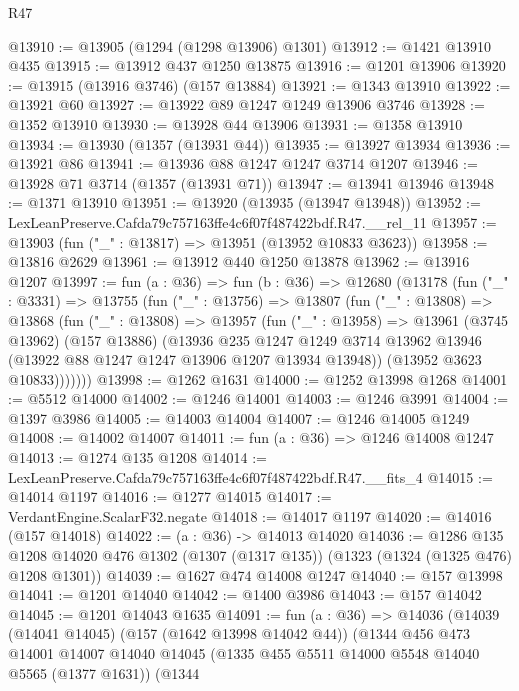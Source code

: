 \begin{lexlean}{R47}
\begin{coremodule}
@13910 := @13905 (@1294 (@1298 @13906) @1301)
@13912 := @1421 @13910 @435
@13915 := @13912 @437 @1250 @13875
@13916 := @1201 @13906
@13920 := @13915 (@13916 @3746) (@157 @13884)
@13921 := @1343 @13910
@13922 := @13921 @60
@13927 := @13922 @89 @1247 @1249 @13906 @3746
@13928 := @1352 @13910
@13930 := @13928 @44 @13906
@13931 := @1358 @13910
@13934 := @13930 (@1357 (@13931 @44))
@13935 := @13927 @13934
@13936 := @13921 @86
@13941 := @13936 @88 @1247 @1247 @3714 @1207
@13946 := @13928 @71 @3714 (@1357 (@13931 @71))
@13947 := @13941 @13946
@13948 := @1371 @13910
@13951 := @13920 (@13935 (@13947 @13948))
@13952 := LexLeanPreserve.Cafda79c757163ffe4c6f07f487422bdf.R47.__rel_11
@13957 := @13903 (fun ("_" : @13817) => @13951 (@13952 @10833 @3623))
@13958 := @13816 @2629
@13961 := @13912 @440 @1250 @13878
@13962 := @13916 @1207
@13997 := fun (a : @36) =>
  fun (b : @36) =>
  @12680
    (@13178
      (fun ("_" : @3331) =>
      @13755
        (fun ("_" : @13756) =>
        @13807
          (fun ("_" : @13808) =>
          @13868
            (fun ("_" : @13808) =>
            @13957
              (fun ("_" : @13958) =>
              @13961
                (@3745 @13962)
                (@157 @13886)
                (@13936
                  @235
                  @1247
                  @1249
                  @3714
                  @13962
                  @13946
                  (@13922 @88 @1247 @1247 @13906 @1207 @13934 @13948))
                (@13952 @3623 @10833)))))))
@13998 := @1262 @1631
@14000 := @1252 @13998 @1268
@14001 := @5512 @14000
@14002 := @1246 @14001
@14003 := @1246 @3991
@14004 := @1397 @3986
@14005 := @14003 @14004
@14007 := @1246 @14005 @1249
@14008 := @14002 @14007
@14011 := fun (a : @36) => @1246 @14008 @1247
@14013 := @1274 @135 @1208
@14014 := LexLeanPreserve.Cafda79c757163ffe4c6f07f487422bdf.R47.__fits_4
@14015 := @14014 @1197
@14016 := @1277 @14015
@14017 := VerdantEngine.ScalarF32.negate
@14018 := @14017 @1197
@14020 := @14016 (@157 @14018)
@14022 := (a : @36) -> @14013 @14020
@14036 := @1286
    @135
    @1208
    @14020
    @476
    @1302
    (@1307 (@1317 @135))
    (@1323 (@1324 (@1325 @476) @1208 @1301))
@14039 := @1627 @474 @14008 @1247
@14040 := @157 @13998
@14041 := @1201 @14040
@14042 := @1400 @3986
@14043 := @157 @14042
@14045 := @1201 @14043 @1635
@14091 := fun (a : @36) =>
  @14036
    (@14039
      (@14041 @14045)
      (@157 (@1642 @13998 @14042 @44))
      (@1344
        @456
        @473
        @14001
        @14007
        @14040
        @14045
        (@1335 @455 @5511 @14000 @5548 @14040 @5565 (@1377 @1631))
        (@1344

\end{coremodule}
\end{lexlean}

